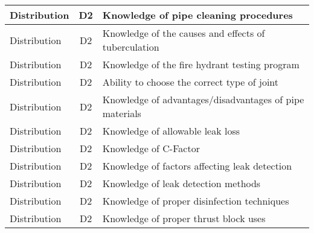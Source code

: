 \documentclass{article}
\begin{document}
\begin{table}[]
\begin{tabular}{|l|c|l|}
Distribution                           & D2             & Knowledge of pipe   cleaning procedures                                                                                           \\ \hline
Distribution                           & D2             & Knowledge of the   causes and effects of tuberculation                                                                            \\ \hline
Distribution                           & D2             & Knowledge of the fire   hydrant testing program                                                                                   \\ \hline
Distribution                           & D2             & Ability to choose the   correct type of joint                                                                                     \\ \hline
Distribution                           & D2             & Knowledge of   advantages/disadvantages of pipe materials                                                                         \\ \hline
Distribution                           & D2             & Knowledge of   allowable leak loss                                                                                                \\ \hline
Distribution                           & D2             & Knowledge of C-Factor                                                                                                             \\ \hline
Distribution                           & D2             & Knowledge of factors   affecting leak detection                                                                                   \\ \hline
Distribution                           & D2             & Knowledge of leak   detection methods                                                                                             \\ \hline
Distribution                           & D2             & Knowledge of proper   disinfection techniques                                                                                     \\ \hline
Distribution                           & D2             & Knowledge of proper   thrust block uses                                                                                           \\ \hline

\end{tabular}
\end{table}
\end{document}
